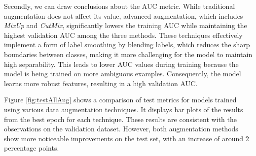 Secondly, we can draw conclusions about the AUC metric. While traditional augmentation does not affect its value, advanced augmentation, which includes \textit{MixUp} and \textit{CutMix}, significantly lowers the training AUC while maintaining the highest validation AUC among the three methods. These techniques effectively implement a form of label smoothing by blending labels, which reduces the sharp boundaries between classes, making it more challenging for the model to maintain high separability. This leads to lower AUC values during training because the model is being trained on more ambiguous examples.  Consequently, the model learns more robust features, resulting in a high validation AUC.


Figure \ref{fig:testAllAug} shows a comparison of test metrics for models trained using various data augmentation techniques. It displays bar plots of the results from the best epoch for each technique. These results are consistent with the observations on the validation dataset. However, both augmentation methods show more noticeable improvements on the test set, with an increase of around 2 percentage points.

